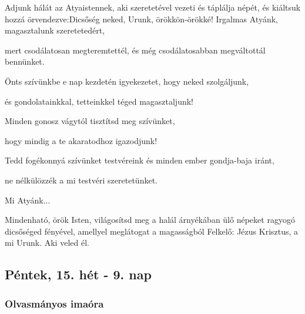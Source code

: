 \documentclass[twoside]{article}
\begin{document}



\begin{preces}{Adjunk hálát az Atyaistennek, aki szeretetével vezeti és táplálja népét, és kiáltsuk hozzá örvendezve:}{Dicsőség neked, Urunk, örökkön-örökké!}
  Irgalmas Atyánk, magasztalunk szeretetedért,

  \reddash mert csodálatosan megteremtettél, és még csodálatosabban megváltottál bennünket.

  Önts szívünkbe e nap kezdetén igyekezetet, hogy neked szolgáljunk,

  \reddash és gondolatainkkal, tetteinkkel téged magasztaljunk!

  Minden gonosz vágytól tisztítsd meg szívünket,

  \reddash hogy mindig a te akaratodhoz igazodjunk!

  Tedd fogékonnyá szívünket testvéreink és minden ember gondja-baja iránt,

  \reddash ne nélkülözzék a mi testvéri szeretetünket.
\end{preces}
Mi Atyánk...

Mindenható, örök Isten, világosítsd meg a halál árnyékában ülő népeket ragyogó dicsőséged fényével, amellyel meglátogat a magasságból Felkelő: Jézus Krisztus, a mi Urunk. Aki veled él.


\subsection*{Péntek, 15. hét - 9. nap}


\subsubsection*{Olvasmányos imaóra}


\end{document}
